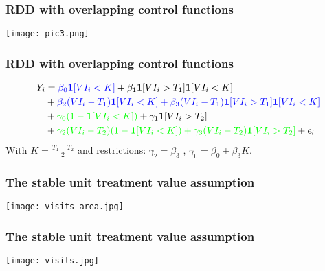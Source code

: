 \documentclass{beamer}
\begin{document}
\begin{frame}
\frametitle{RDD with overlapping control functions}
\begin{center}
\texttt{[image: pic3.png]}
\label{pic3}
\end{center}
\end{frame}

\begin{frame}
\frametitle{RDD with overlapping control functions}
\begin{align*}
Y_{i} &= {\color{blue}{\beta _0\mathbf{1}[VI_{i}<K]}} + \beta_1 \mathbf{1}[VI_{i}>T_{1}]\mathbf{1}[VI_{i}<K]\\	   
&+{\color{blue}{\beta_2 (VI_{i}-T_{1})\mathbf{1}[VI_{i}<K] + \beta_3 (VI_{i}-T_{1})\mathbf{1}[VI_{i}>T_{1}]\mathbf{1}[VI_{i}<K]}} \\
&+ {\color{green}{\gamma_0 (1-\mathbf{1}[VI_{i}<K])}} + \gamma_1 \mathbf{1}[VI_{i}>T_{2}]  \\
&+ {\color{green}{\gamma_2 (VI_{i}-T_{2})(1-\mathbf{1}[VI_{i}<K]) + \gamma_3 (VI_{i}-T_{2})\mathbf{1}[VI_{i}>T_{2}]}} + \epsilon_i
\end{align*}
With $K=\frac{T_{1} + T_{2}}{2}$ and restrictions: $\gamma_2 = \beta_3$ , $ \gamma_0 = \beta_0 + \beta_3 K$.\\
\end{frame}

\begin{frame}
\frametitle{The stable unit treatment value assumption}
\begin{center}
\texttt{[image: visits\_area.jpg]}
\label{visits_area}
\end{center}
\end{frame}

\begin{frame}
\frametitle{The stable unit treatment value assumption}
\begin{center}
\texttt{[image: visits.jpg]}
\label{visits}
\end{center}
\end{frame}
\end{document}
